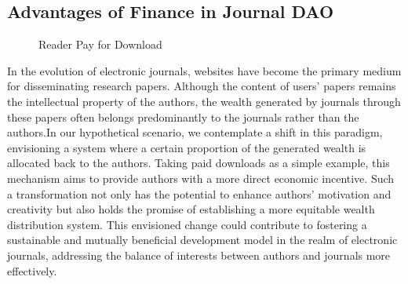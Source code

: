 \documentclass[lettersize,journal]{IEEEtran}
\begin{document}
\subsection{Advantages of Finance in Journal DAO}


\begin{figure}[!hb]
  \centering
  \hfil
  \caption{Reader Pay for Download}
  \label{artcledownload}
\end{figure}


In the evolution of electronic journals, websites have become the primary medium for disseminating research papers. Although the content of users' papers remains the intellectual property of the authors, the wealth generated by journals through these papers often belongs predominantly to the journals rather than the authors.In our hypothetical scenario, we contemplate a shift in this paradigm, envisioning a system where a certain proportion of the generated wealth is allocated back to the authors. Taking paid downloads as a simple example, this mechanism aims to provide authors with a more direct economic incentive. Such a transformation not only has the potential to enhance authors' motivation and creativity but also holds the promise of establishing a more equitable wealth distribution system. This envisioned change could contribute to fostering a sustainable and mutually beneficial development model in the realm of electronic journals, addressing the balance of interests between authors and journals more effectively.
\end{document}
